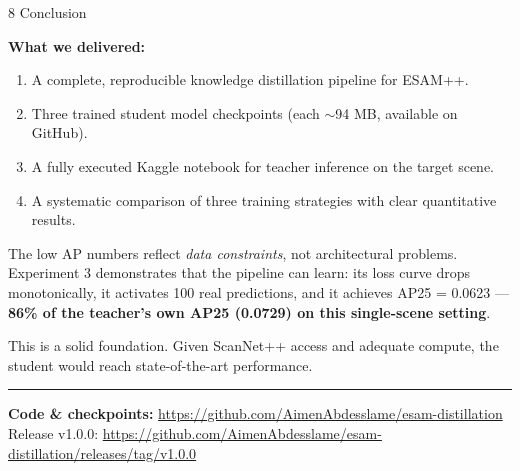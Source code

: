 \documentclass[12pt,a4paper]{article}
\begin{document}
\vspace{10pt}

\begin{sectionbox}[mainblue]{8 \quad Conclusion}

\begin{keybox}[mainblue]
\textbf{What we delivered:}
\begin{enumerate}[noitemsep]
  \item A complete, reproducible knowledge distillation pipeline for ESAM++.
  \item Three trained student model checkpoints (each $\sim$94 MB, available on GitHub).
  \item A fully executed Kaggle notebook for teacher inference on the target scene.
  \item A systematic comparison of three training strategies with clear quantitative results.
\end{enumerate}
\end{keybox}

\medskip

The low AP numbers reflect \textit{data constraints}, not architectural problems.
Experiment 3 demonstrates that the pipeline can learn: its loss curve drops
monotonically, it activates 100 real predictions, and it achieves AP25 = 0.0623
--- \textbf{86\% of the teacher's own AP25 (0.0729) on this single-scene setting}.

This is a solid foundation. Given ScanNet++ access and adequate compute,
the student would reach state-of-the-art performance.

\medskip
\hrule
\vspace{4pt}
\small
\textbf{Code \& checkpoints:} \url{https://github.com/AimenAbdesslame/esam-distillation} \quad
Release v1.0.0: \url{https://github.com/AimenAbdesslame/esam-distillation/releases/tag/v1.0.0}

\end{sectionbox}
\end{document}
